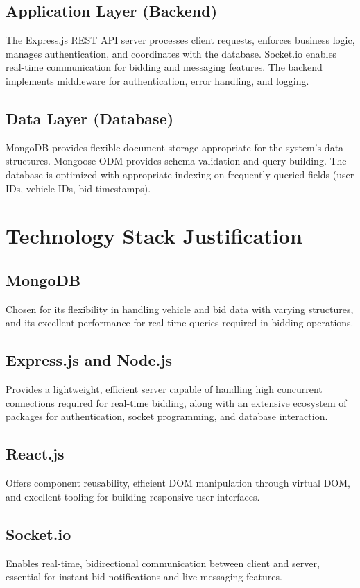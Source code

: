\subsection{Application Layer (Backend)}
The Express.js REST API server processes client requests, enforces business logic, manages authentication, and coordinates with the database. Socket.io enables real-time communication for bidding and messaging features. The backend implements middleware for authentication, error handling, and logging.

\subsection{Data Layer (Database)}
MongoDB provides flexible document storage appropriate for the system's data structures. Mongoose ODM provides schema validation and query building. The database is optimized with appropriate indexing on frequently queried fields (user IDs, vehicle IDs, bid timestamps).

\section{Technology Stack Justification}

\subsection{MongoDB}
Chosen for its flexibility in handling vehicle and bid data with varying structures, and its excellent performance for real-time queries required in bidding operations.

\subsection{Express.js and Node.js}
Provides a lightweight, efficient server capable of handling high concurrent connections required for real-time bidding, along with an extensive ecosystem of packages for authentication, socket programming, and database interaction.

\subsection{React.js}
Offers component reusability, efficient DOM manipulation through virtual DOM, and excellent tooling for building responsive user interfaces.

\subsection{Socket.io}
Enables real-time, bidirectional communication between client and server, essential for instant bid notifications and live messaging features.

